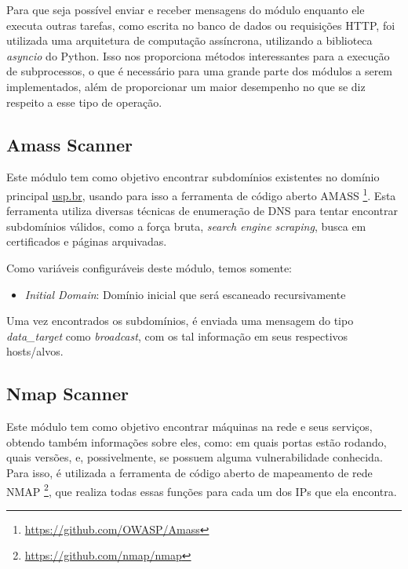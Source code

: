     Para que seja possível enviar e receber mensagens do módulo enquanto ele executa outras tarefas, como escrita no banco de dados ou requisições HTTP, foi utilizada uma arquitetura de computação assíncrona, utilizando a biblioteca \textit{asyncio} do Python. Isso nos proporciona métodos interessantes para a execução de subprocessos, o que é necessário para uma grande parte dos módulos a serem implementados, além de proporcionar um maior desempenho no que se diz respeito a esse tipo de operação. 

    \subsection{Amass Scanner}
    
    Este módulo tem como objetivo encontrar subdomínios existentes no domínio principal \url{usp.br}, usando para isso a ferramenta de código aberto AMASS \footnote{\url{https://github.com/OWASP/Amass}}. Esta ferramenta utiliza diversas técnicas de enumeração de DNS para tentar encontrar subdomínios válidos, como a força bruta, \textit{search engine scraping}, busca em certificados e páginas arquivadas.
    
    Como variáveis configuráveis deste módulo, temos somente:
    \begin{itemize}
    \item \emph{Initial Domain}: Domínio inicial que será escaneado recursivamente
    \end{itemize}
    
    Uma vez encontrados os subdomínios, é enviada uma mensagem do tipo \textit{data\_target} como \textit{broadcast}, com os tal informação em seus respectivos hosts/alvos.
    
    \subsection{Nmap Scanner}
    Este módulo tem como objetivo encontrar máquinas na rede e seus serviços, obtendo também informações sobre eles, como: em quais portas estão rodando, quais versões, e, possivelmente, se possuem alguma vulnerabilidade conhecida. Para isso, é utilizada a ferramenta de código aberto de mapeamento de rede NMAP \footnote{\url{https://github.com/nmap/nmap}}, que realiza todas essas funções para cada um dos IPs que ela encontra.
    
